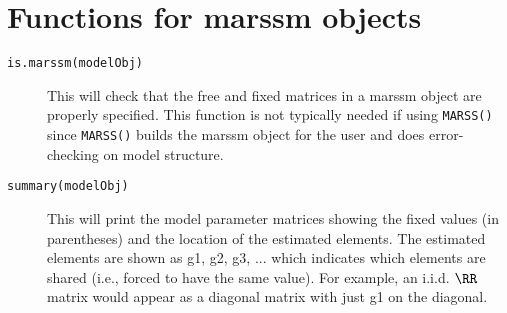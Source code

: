 
\section{Functions for marssm objects}
\begin{description}	
		\item[\texttt{is.marssm(modelObj)}] This will check that the free and fixed matrices in a marssm object are properly specified.  This function is not typically needed if using \texttt{MARSS()} since \texttt{MARSS()} builds the marssm object for the user and does error-checking on model structure.
		\item[\texttt{summary(modelObj)}] This will print the model parameter matrices showing the fixed values (in parentheses) and the location of the estimated elements.  The estimated elements are shown as g1, g2, g3, ... which indicates which elements are shared (i.e., forced to have the same value).  For example, an i.i.d. $\RR$ matrix would appear as a diagonal matrix with just g1 on the diagonal.
\end{description}

